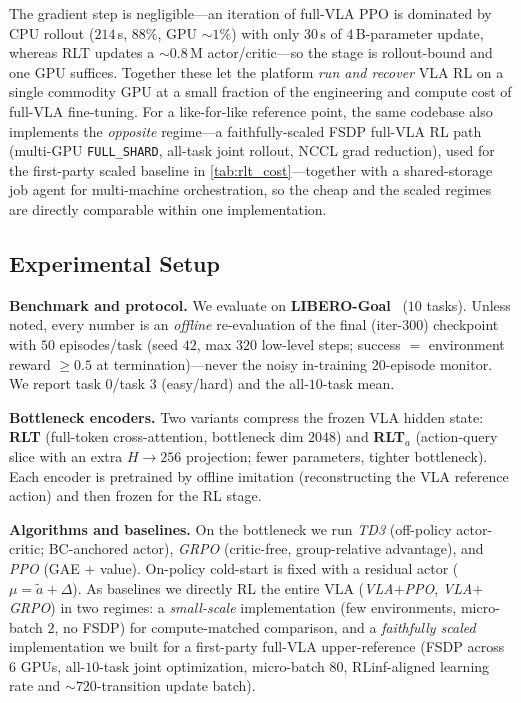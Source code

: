 \documentclass[11pt]{article}
\begin{document}
The gradient step is negligible---an iteration of full-VLA PPO is dominated by CPU rollout ($214$\,s, $88\%$, GPU $\sim$$1\%$) with only $30$\,s of $4$\,B-parameter update, whereas RLT updates a ${\sim}0.8$\,M actor/critic---so the stage is rollout-bound and one GPU suffices. Together these let the platform \emph{run and recover} VLA RL on a single commodity GPU at a small fraction of the engineering and compute cost of full-VLA fine-tuning. For a like-for-like reference point, the same codebase also implements the \emph{opposite} regime---a faithfully-scaled FSDP full-VLA RL path (multi-GPU \texttt{FULL\_SHARD}, all-task joint rollout, NCCL grad reduction), used for the first-party scaled baseline in \cref{tab:rlt_cost}---together with a shared-storage job agent for multi-machine orchestration, so the cheap and the scaled regimes are directly comparable within one implementation.

\subsection{Experimental Setup}
\label{sec:rlt_setup}

\textbf{Benchmark and protocol.} We evaluate on \textbf{LIBERO-Goal}~\citep{liu2023libero} ($10$ tasks). Unless noted, every number is an \emph{offline} re-evaluation of the final (iter-$300$) checkpoint with $50$ episodes/task (seed $42$, max $320$ low-level steps; success $=$ environment reward $\ge 0.5$ at termination)---never the noisy in-training $20$-episode monitor. We report task $0$/task $3$ (easy/hard) and the all-$10$-task mean.

\textbf{Bottleneck encoders.} Two variants compress the frozen VLA hidden state: \textbf{RLT} (full-token cross-attention, bottleneck dim $2048$) and \textbf{RLT$_a$} (action-query slice with an extra $H{\to}256$ projection; fewer parameters, tighter bottleneck). Each encoder is pretrained by offline imitation (reconstructing the VLA reference action) and then frozen for the RL stage.

\textbf{Algorithms and baselines.} On the bottleneck we run \emph{TD3} (off-policy actor-critic; BC-anchored actor), \emph{GRPO} (critic-free, group-relative advantage), and \emph{PPO} (GAE $+$ value). On-policy cold-start is fixed with a residual actor ($\mu=\tilde a+\Delta$). As baselines we directly RL the entire VLA (\emph{VLA$+$PPO}, \emph{VLA$+$GRPO}) in two regimes: a \emph{small-scale} implementation (few environments, micro-batch $2$, no FSDP) for compute-matched comparison, and a \emph{faithfully scaled} implementation we built for a first-party full-VLA upper-reference (FSDP across $6$ GPUs, all-$10$-task joint optimization, micro-batch $80$, RLinf-aligned learning rate and $\sim$$720$-transition update batch).
\end{document}

